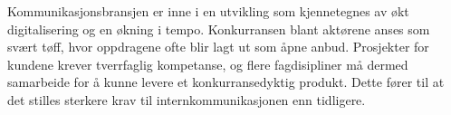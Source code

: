 \indent \newline
Kommunikasjonsbransjen er inne i en utvikling som kjennetegnes av økt digitalisering og en økning i tempo. Konkurransen blant aktørene anses som svært tøff, hvor oppdragene ofte blir lagt ut som åpne anbud. Prosjekter for kundene krever tverrfaglig kompetanse, og flere fagdisipliner må dermed samarbeide for å kunne levere et konkurransedyktig produkt. Dette fører til at det stilles sterkere krav til internkommunikasjonen enn tidligere. 
